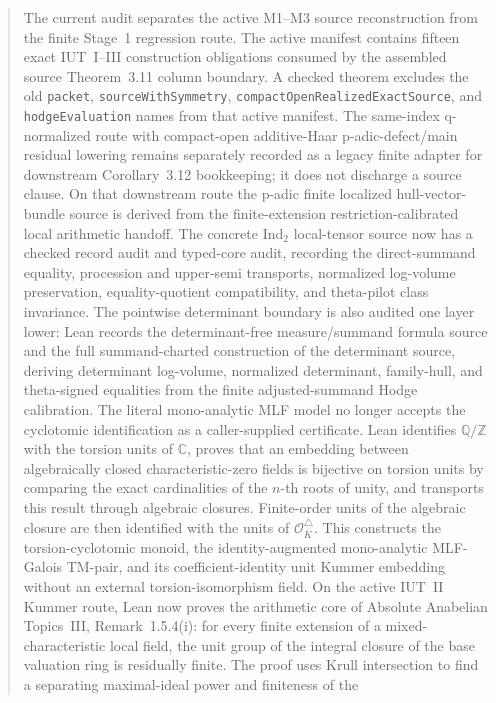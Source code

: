 \documentclass[11pt]{article}
\newcommand{\IndTwo}{\ensuremath{\mathrm{Ind}_2}}
\theoremstyle{plain}
\theoremstyle{definition}
\theoremstyle{remark}
\begin{document}
\begin{abstract}
The current audit separates the active M1--M3 source reconstruction from the
finite Stage~1 regression route.  The active manifest contains fifteen exact
IUT~I--III construction obligations consumed by the assembled source
Theorem~3.11 column boundary.  A checked theorem excludes the old
\texttt{packet}, \texttt{sourceWithSymmetry},
\texttt{compactOpenRealizedExactSource}, and \texttt{hodgeEvaluation} names
from that active manifest.  The same-index q-normalized route with compact-open
additive-Haar p-adic-defect/main residual lowering remains separately recorded
as a legacy finite adapter for downstream Corollary~3.12 bookkeeping; it does
not discharge a source clause.  On that downstream route the
p-adic finite localized
hull-vector-bundle source is derived from the finite-extension
restriction-calibrated local arithmetic handoff.  The concrete \(\IndTwo\)
local-tensor source now has a checked record audit and typed-core audit,
recording the direct-summand equality, procession and upper-semi transports,
normalized log-volume preservation, equality-quotient compatibility, and
theta-pilot class invariance.  The pointwise determinant boundary is also
audited one layer lower: Lean records the determinant-free measure/summand
formula source and the full summand-charted construction of the determinant
source, deriving determinant log-volume, normalized determinant, family-hull,
and theta-signed equalities from the finite adjusted-summand Hodge calibration.
The literal mono-analytic MLF model no longer accepts the cyclotomic
identification as a caller-supplied certificate.  Lean identifies
\(\mathbb{Q}/\mathbb{Z}\) with the torsion units of \(\mathbb{C}\), proves
that an embedding between algebraically closed characteristic-zero fields is
bijective on torsion units by comparing the exact cardinalities of the
\(n\)-th roots of unity, and transports this result through algebraic closures.
Finite-order units of the algebraic closure are then identified with the units
of \(\mathcal{O}_{\overline K}^{\triangle}\).  This constructs the
torsion-cyclotomic monoid, the identity-augmented mono-analytic MLF-Galois
TM-pair, and its coefficient-identity unit Kummer embedding without an
external torsion-isomorphism field.
On the active IUT~II Kummer route, Lean now proves the arithmetic core of
Absolute Anabelian Topics~III, Remark~1.5.4(i): for every finite extension of a
mixed-characteristic local field, the unit group of the integral closure of
the base valuation ring is residually finite.  The proof uses Krull
intersection to find a separating maximal-ideal power and finiteness of the

\end{abstract}
\end{document}
